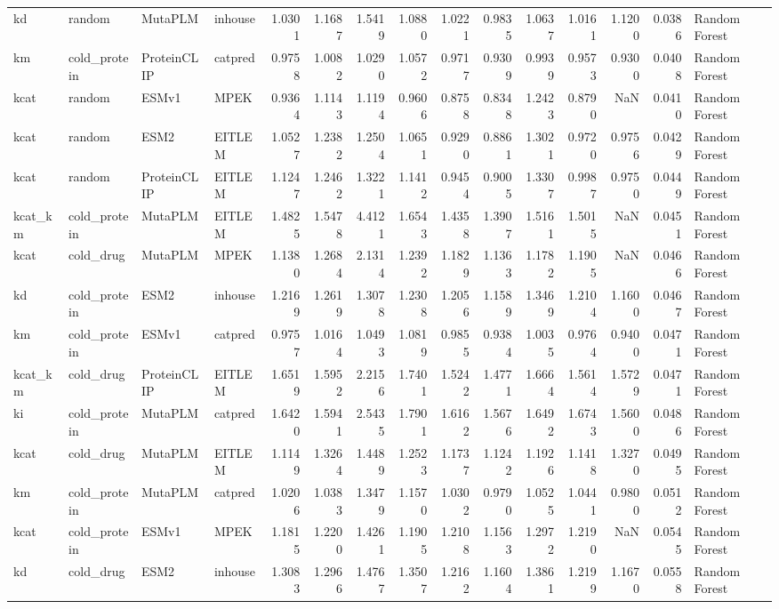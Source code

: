 \begin{tabular}{llllrrrrrrrrrrl}
kd & random & MutaPLM & inhouse & 1.0301 & 1.1687 & 1.5419 & 1.0880 & 1.0221 & 0.9835 & 1.0637 & 1.0161 & 1.1200 & 0.0386 & Random Forest \\
km & cold_protein & ProteinCLIP & catpred & 0.9758 & 1.0082 & 1.0290 & 1.0572 & 0.9717 & 0.9309 & 0.9939 & 0.9573 & 0.9300 & 0.0408 & Random Forest \\
kcat & random & ESMv1 & MPEK & 0.9364 & 1.1143 & 1.1194 & 0.9606 & 0.8758 & 0.8348 & 1.2423 & 0.8790 & NaN & 0.0410 & Random Forest \\
kcat & random & ESM2 & EITLEM & 1.0527 & 1.2382 & 1.2504 & 1.0651 & 0.9290 & 0.8861 & 1.3021 & 0.9720 & 0.9756 & 0.0429 & Random Forest \\
kcat & random & ProteinCLIP & EITLEM & 1.1247 & 1.2462 & 1.3221 & 1.1412 & 0.9454 & 0.9005 & 1.3307 & 0.9987 & 0.9750 & 0.0449 & Random Forest \\
kcat_km & cold_protein & MutaPLM & EITLEM & 1.4825 & 1.5478 & 4.4121 & 1.6543 & 1.4358 & 1.3907 & 1.5161 & 1.5015 & NaN & 0.0451 & Random Forest \\
kcat & cold_drug & MutaPLM & MPEK & 1.1380 & 1.2684 & 2.1314 & 1.2392 & 1.1829 & 1.1363 & 1.1782 & 1.1905 & NaN & 0.0466 & Random Forest \\
kd & cold_protein & ESM2 & inhouse & 1.2169 & 1.2619 & 1.3078 & 1.2308 & 1.2056 & 1.1589 & 1.3469 & 1.2104 & 1.1600 & 0.0467 & Random Forest \\
km & cold_protein & ESMv1 & catpred & 0.9757 & 1.0164 & 1.0493 & 1.0819 & 0.9855 & 0.9384 & 1.0035 & 0.9764 & 0.9400 & 0.0471 & Random Forest \\
kcat_km & cold_drug & ProteinCLIP & EITLEM & 1.6519 & 1.5952 & 2.2156 & 1.7401 & 1.5242 & 1.4771 & 1.6664 & 1.5614 & 1.5729 & 0.0471 & Random Forest \\
ki & cold_protein & MutaPLM & catpred & 1.6420 & 1.5941 & 2.5435 & 1.7901 & 1.6162 & 1.5676 & 1.6492 & 1.6743 & 1.5600 & 0.0486 & Random Forest \\
kcat & cold_drug & MutaPLM & EITLEM & 1.1149 & 1.3264 & 1.4489 & 1.2523 & 1.1737 & 1.1242 & 1.1926 & 1.1418 & 1.3270 & 0.0495 & Random Forest \\
km & cold_protein & MutaPLM & catpred & 1.0206 & 1.0383 & 1.3479 & 1.1570 & 1.0302 & 0.9790 & 1.0525 & 1.0441 & 0.9800 & 0.0512 & Random Forest \\
kcat & cold_protein & ESMv1 & MPEK & 1.1815 & 1.2200 & 1.4261 & 1.1905 & 1.2108 & 1.1563 & 1.2972 & 1.2190 & NaN & 0.0545 & Random Forest \\
kd & cold_drug & ESM2 & inhouse & 1.3083 & 1.2966 & 1.4767 & 1.3507 & 1.2162 & 1.1604 & 1.3861 & 1.2199 & 1.1670 & 0.0558 & Random Forest \\

\end{tabular}
